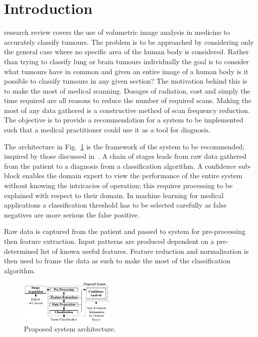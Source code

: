 \documentclass[journal]{IEEEtran}
\begin{document}
\section{Introduction}
 research review covers the use of volumetric image analysis in medicine to accurately classify tumours. 
The problem is to be approached by considering only the general case where no specific area of the human body is considered.
Rather than trying to classify lung or brain tumours individually the goal is to consider what tumours have in common and given an entire image of a human body is it possible to classify tumours in any given section?
The motivation behind this is to make the most of medical scanning.
Dosages of radiation, cost and simply the time required are all reasons to reduce the number of required scans.
Making the most of any data gathered is a constructive method of scan frequency reduction.
The objective is to provide a recommendation for a system to be implemented such that a medical practitioner could use it as a tool for diagnosis.  

The architecture in Fig.~\ref{fig:Proposed} is the framework of the system to be recommended; inspired by those discussed in~\cite{ahmed2011efficacy,kumar2011classification,hau07feat,sachdeva2011multiclass,kostis03three}.
A chain of stages leads from raw data gathered from the patient to a diagnosis from a classification algorithm.
A confidence sub-block enables the domain expert to view the performance of the entire system without knowing the intricacies of operation; this requires processing to be explained with respect to their domain.
In machine learning for medical applications a classification threshold has to be selected carefully as false negatives are more serious the false positive.

Raw data is captured from the patient and passed to system for pre-processing then feature extraction.
Input patterns are produced dependent on a pre-determined list of known useful features. 
Feature reduction and normalisation is then used to frame the data as such to make the most of the classification algorithm.

\begin{figure}[!htb]
   \centering
   \includegraphics[width = 0.4\textwidth]{Figures/Proposed.pdf}
   \caption{Proposed system architecture.}
   \label{fig:Proposed}
\end{figure}
\end{document}

